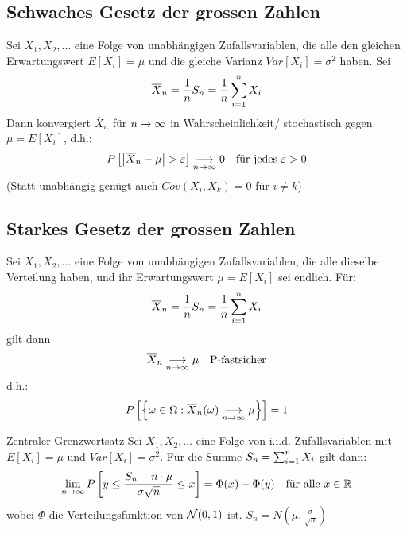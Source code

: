 \BoxEnd{}
\subsection{Schwaches Gesetz der grossen Zahlen}
Sei $X_1, X_2, \dots$ eine Folge von unabhängigen Zufallsvariablen, die alle
den gleichen Erwartungswert $E[X_i] = \mu$ und die gleiche Varianz $Var[X_i] =
  \sigma^2$ haben. Sei
\begin{align*}
  \overline{X}_n = \frac{1}{n} S_n = \frac{1}{n} \sum_{i = 1}^n X_i
\end{align*}
Dann konvergiert $\overline{X}_n$ für $n \rightarrow \infty$ in Wahrscheinlichkeit/
stochastisch gegen $\mu = E[X_i]$, d.h.:
\begin{align*}
  P \left[ \abs{\overline{X}_n - \mu} > \varepsilon \right] \underset{n \rightarrow \infty}{\longrightarrow} 0
   &  & \text{für jedes } \varepsilon > 0
\end{align*}
(Statt unabhängig genügt auch $Cov (X_i, X_k) = 0$ für $i \neq k$)
\subsection{Starkes Gesetz der grossen Zahlen}
Sei $X_1, X_2, \dots$ eine Folge von unabhängigen Zufallsvariablen, die alle
dieselbe Verteilung haben, und ihr Erwartungswert $\mu = E[X_i]$ sei endlich.
Für:
\begin{align*}
  \overline{X}_n = \frac{1}{n} S_n = \frac{1}{n} \sum_{i = 1}^n X_i
\end{align*}
gilt dann
\begin{align*}
  \overline{X}_n \underset{n \rightarrow \infty}{\longrightarrow} \mu &  & \text{P-fastsicher}
\end{align*}
d.h.:
\begin{align*}
  P \left[ \left\{ \omega \in \Omega : \overline{X}_n (\omega) \underset{n \rightarrow \infty}{\longrightarrow} \mu \right\} \right] = 1
\end{align*}
\begin{definition}{Zentraler Grenzwertsatz}
  Sei $X_1, X_2, \dots$ eine Folge von i.i.d. Zufallsvariablen mit $E[X_i] = \mu$
  und $Var[X_i] = \sigma^2$. Für die Summe $S_n = \sum_{i = 1}^n X_i$ gilt dann:
  \begin{align*}
    \lim_{n \rightarrow \infty} P \left[y \leq \frac{S_n - n \cdot \mu}{\sigma \sqrt{n}} \leq x \right] = \Phi (x) - \Phi (y)
     &  & \text{für alle } x \in \mathbb{R}
  \end{align*}
  wobei $\Phi$ die Verteilungsfunktion von $\mathcal{N} (0, 1)$ ist. $S_n = N(\mu, \frac{\sigma}{\sqrt{n}})$
\end{definition}